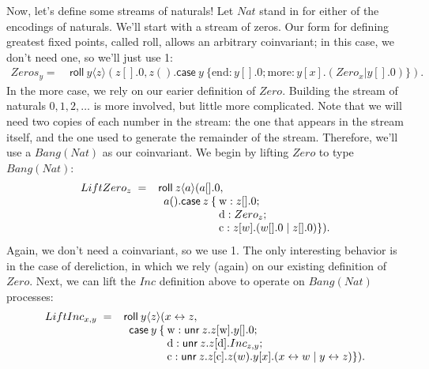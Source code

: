 \documentclass[envcountsame]{llncs}
\newcommand{\mkwd}[1]{\mathsf{#1}}
\newcommand{\tkwd}[1]{\textsf{#1}}
\newcommand{\link}[2]{#1 \leftrightarrow #2}
\newcommand{\unr}[1]{\mkwd{unr}\:#1}
\newcommand{\roll}[5]{\mkwd{roll}\:#1 \langle #2 \rangle (#4,#5)}
\newcommand{\clabel}[1]{\mathrm{#1}}
\renewcommand{\case}[2]{\mkwd{case}\:#1\:\{#2\}}
\newcommand{\sel}[2]{#1[\clabel{#2}]}
\begin{document}
Now, let's define some streams of naturals!  Let $Nat$ stand in for either of the encodings of
naturals.  We'll start with a stream of zeros.  Our form for defining greatest fixed points, called
\tkwd{roll}, allows an arbitrary coinvariant; in this case, we don't need one, so we'll just use 1:
%
{\small\begin{align*}
  Zeros_y =\ &\roll{y}{z}{1}{z[].0}{z().\case{y}{\clabel{end}: y[].0; \clabel{more}: y[x].(Zero_x | y[].0)}}.
\end{align*}}
%
In the \textrm{more} case, we rely on our earier definition of $Zero$.  Building the stream of
naturals $0,1,2,\dots$ is more involved, but little more complicated. Note that we will need two
copies of each number in the stream: the one that appears in the stream itself, and the one used to
generate the remainder of the stream.  Therefore, we'll use a $Bang(Nat)$ as our coinvariant.  We
begin by lifting $Zero$ to type $Bang(Nat)$:
%
{\small\[\begin{array}{r@{\hspace{2mm}}c@{\hspace{2mm}}l@{\hspace{0mm}}l@{\:}l}
  LiftZero_z & = & \multicolumn{3}{l}{\mkwd{roll} \: z \langle a \rangle (a[].0,} \\
  & & \quad & a().\mkwd{case}\: z \: \{ &\clabel{w}: z[].0; \\
  & & & & \clabel{d}: Zero_z; \\
  & & & & \clabel{c}: z[w].(w[].0 \mid z[].0) \}).
\end{array}\]}
%
Again, we don't need a coinvariant, so we use 1.  The only interesting behavior is in the case of
dereliction, in which we rely (again) on our existing definition of $Zero$.  Next, we can lift the
$Inc$ definition above to operate on $Bang(Nat)$ processes:
%
{\small\[\begin{array}{r@{\hspace{2mm}}c@{\hspace{2mm}}l@{\hspace{0mm}}l@{\:}l}
  LiftInc_{x,y} & = & \multicolumn{3}{l}{\mkwd{roll} \: y \langle z \rangle (\link{x}{z},} \\
  & & \quad & \mkwd{case} \: y \: \{ & \clabel{w}: \unr{z}.\sel{z}{w}.y[].0; \\
  & & & & \clabel{d}: \unr{z}.\sel{z}{d}.Inc_{z,y}; \\
  & & & & \clabel{c}: \unr{z}.\sel{z}{c}.z(w).y[x].(\link{x}{w} \mid \link{y}{z}) \}).
\end{array}\]}
\end{document}

